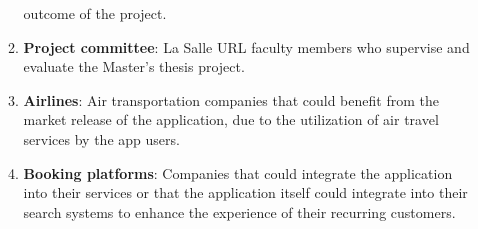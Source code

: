 \documentclass[../memory.tex]{subfiles}
\begin{document}
\begin{enumerate}[label = -]
\begin{enumerate}[label = -]
		            outcome of the project.
		      \item \textbf{Project committee}: La Salle URL faculty members who
		            supervise and evaluate the Master's thesis project.
		      \item \textbf{Airlines}: Air transportation companies that could
		            benefit from the market release of the application, due to the
		            utilization of air travel services by the app users.
		      \item \textbf{Booking platforms}: Companies that could integrate the
		            application into their services or that the application itself
		            could integrate into their search systems to enhance the
		            experience of their recurring customers.
	      \end{enumerate}
\end{enumerate}
\end{document}
